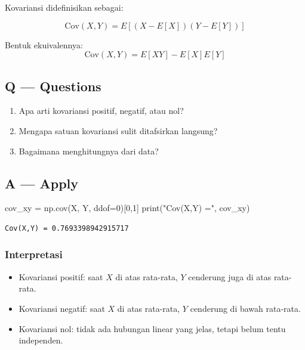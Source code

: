 \documentclass[
  letterpaper,
  DIV=11,
  numbers=noendperiod]{scrreprt}
\newenvironment{Shaded}{\begin{snugshade}}{\end{snugshade}}
\newcommand{\BuiltInTok}[1]{\textcolor[rgb]{0.00,0.23,0.31}{#1}}
\newcommand{\DecValTok}[1]{\textcolor[rgb]{0.68,0.00,0.00}{#1}}
\newcommand{\NormalTok}[1]{\textcolor[rgb]{0.00,0.23,0.31}{#1}}
\newcommand{\OperatorTok}[1]{\textcolor[rgb]{0.37,0.37,0.37}{#1}}
\newcommand{\StringTok}[1]{\textcolor[rgb]{0.13,0.47,0.30}{#1}}
\providecommand{\tightlist}{%
  \setlength{\itemsep}{0pt}\setlength{\parskip}{0pt}}
\begin{document}
Kovariansi didefinisikan sebagai:

\[
\mathrm{Cov}(X,Y)=E[(X-E[X])(Y-E[Y])]
\]

Bentuk ekuivalennya: \[
\mathrm{Cov}(X,Y)=E[XY]-E[X]E[Y]
\]

\subsection{Q --- Questions}\label{q-questions-36}

\begin{enumerate}
\def\labelenumi{\arabic{enumi}.}
\tightlist
\item
  Apa arti kovariansi positif, negatif, atau nol?
\item
  Mengapa satuan kovariansi sulit ditafsirkan langsung?
\item
  Bagaimana menghitungnya dari data?
\end{enumerate}

\subsection{A --- Apply}\label{a-apply-35}

\begin{Shaded}
\begin{Highlighting}[]
\NormalTok{cov\_xy }\OperatorTok{=}\NormalTok{ np.cov(X, Y, ddof}\OperatorTok{=}\DecValTok{0}\NormalTok{)[}\DecValTok{0}\NormalTok{,}\DecValTok{1}\NormalTok{]}
\BuiltInTok{print}\NormalTok{(}\StringTok{"Cov(X,Y) ="}\NormalTok{, cov\_xy)}
\end{Highlighting}
\end{Shaded}

\begin{verbatim}
Cov(X,Y) = 0.7693398942915717
\end{verbatim}

\subsubsection{Interpretasi}\label{interpretasi-19}

\begin{itemize}
\tightlist
\item
  Kovariansi positif: saat \(X\) di atas rata-rata, \(Y\) cenderung juga
  di atas rata-rata.
\item
  Kovariansi negatif: saat \(X\) di atas rata-rata, \(Y\) cenderung di
  bawah rata-rata.
\item
  Kovariansi nol: tidak ada hubungan linear yang jelas, tetapi belum
  tentu independen.
\end{itemize}
\end{document}
